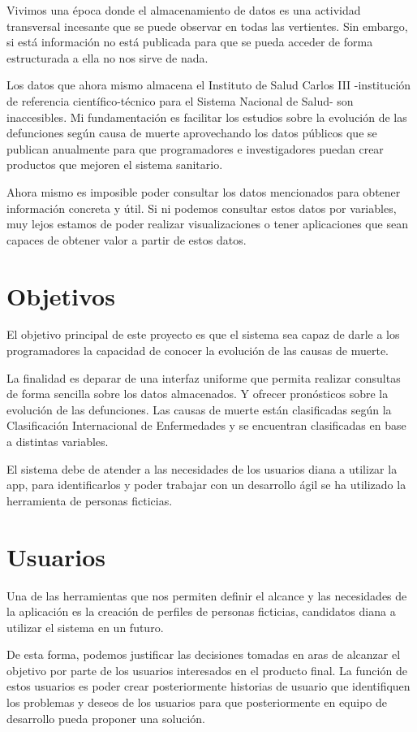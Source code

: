 Vivimos una época donde el almacenamiento de datos es una actividad transversal incesante que se puede observar en todas las vertientes. Sin embargo, si está información no está publicada para que se pueda acceder de forma estructurada a ella no nos sirve de nada. 

Los datos que ahora mismo almacena el Instituto de Salud Carlos III -institución de referencia científico-técnico para el Sistema Nacional de Salud- son inaccesibles.  Mi fundamentación es facilitar los estudios sobre la evolución de las defunciones según causa de muerte aprovechando los datos públicos que se publican anualmente para que programadores e investigadores puedan crear productos que mejoren el sistema sanitario.

Ahora mismo es imposible poder consultar los datos mencionados para obtener información concreta y útil.  Si ni podemos consultar estos datos por variables, muy lejos estamos de poder realizar visualizaciones o tener aplicaciones que sean capaces de obtener valor a partir de estos datos.

\section{Objetivos}
\label{sec:obj}
El objetivo principal de este proyecto es que el sistema sea capaz de darle a los programadores la capacidad de conocer la evolución de las causas de muerte. 

La finalidad es deparar de una interfaz uniforme que permita realizar consultas de forma sencilla sobre los datos almacenados. Y ofrecer pronósticos sobre la evolución de las defunciones. Las causas de muerte están clasificadas según la Clasificación Internacional de Enfermedades y se encuentran clasificadas en base a distintas variables. 

El sistema debe de atender a las necesidades de los usuarios diana a utilizar la app, para identificarlos y poder trabajar con un desarrollo ágil se ha utilizado la herramienta de personas ficticias.

\section{Usuarios}
\label{sec:usu}
Una de las herramientas que nos permiten definir el alcance y las necesidades de la aplicación es la creación de perfiles de personas ficticias, candidatos diana a utilizar el sistema en un futuro.

De esta forma, podemos justificar las decisiones tomadas en aras de alcanzar el objetivo por parte de los usuarios interesados en el producto final. La función de estos usuarios es poder crear posteriormente historias de usuario que identifiquen los problemas y deseos de los usuarios para que posteriormente en equipo de desarrollo pueda proponer una solución.

